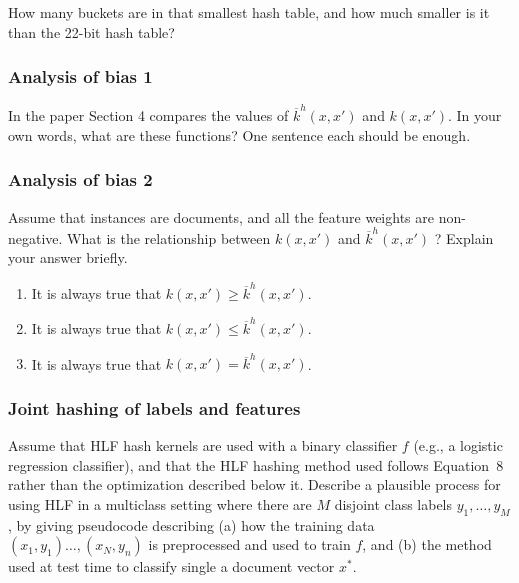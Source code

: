  How many buckets are in that smallest hash table, and how much smaller is it than the 22-bit hash table?
\begin{answer_box}[title=,height=3cm,width=16.5cm]  
    
\end{answer_box}

 \subsubsection{Analysis of bias 1 }

 In the paper Section 4 compares the values of $\overline{k}^h(x,x')$ and $k(x,x')$.  In your own words, what are these functions? One sentence each should be enough.
\begin{answer_box}[title=,height=3cm,width=16.5cm]  
    
\end{answer_box}

\subsubsection{Analysis of bias 2 }


Assume that instances are documents, and all the feature weights are non-negative. 
What is the relationship between $k(x,x')$ and $\overline{k}^h(x,x')$ ?  Explain your answer briefly.

 \begin{enumerate}
 \item It is always true that $k(x,x') \geq \overline{k}^h(x,x')$.
 \item It is always true that $k(x,x') \leq \overline{k}^h(x,x')$.
  \item It is always true that $k(x,x') = \overline{k}^h(x,x')$.
 \end{enumerate}

\begin{answer_box}[title=,height=3cm,width=16.5cm]  
    
\end{answer_box}

\subsubsection{Joint hashing of labels and features }

Assume that HLF hash kernels are used with a binary classifier $f$ (e.g., a logistic regression classifier), and that the HLF hashing method used follows Equation~8 rather than the optimization described below it.  Describe a plausible process for using HLF in a multiclass setting where there are $M$ disjoint class labels $y_1,\ldots,y_M$, by giving pseudocode describing (a) how the training data $(x_1,y_1)\ldots,(x_N,y_n)$ is 
preprocessed and used to train $f$, and (b) the method  used at test time to classify single a document vector $x^*$.


